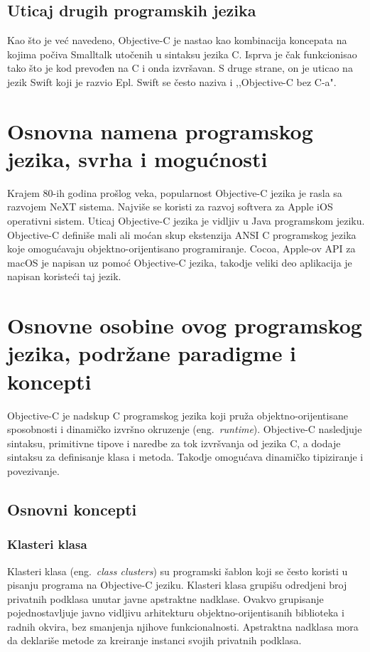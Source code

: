 \documentclass[a4paper]{article}
\begin{document}
\subsection{Uticaj drugih programskih jezika}
\label{subsec:uticaj}
Kao što je već navedeno, Objective-C je nastao kao kombinacija koncepata na kojima počiva Smalltalk utočenih u sintaksu jezika C. Isprva je čak funkcionisao tako što je kod prevođen na C i onda izvršavan. S druge strane, on je uticao na jezik Swift koji je razvio Epl. Swift se često naziva i ,,Objective-C bez C-a". 

\section{Osnovna namena programskog jezika, svrha i mogućnosti}
\label{sec:namena}
Krajem 80-ih godina prošlog veka, popularnost Objective-C jezika je rasla sa razvojem NeXT sistema. Najviše se koristi za razvoj softvera za Apple iOS operativni sistem. Uticaj Objective-C jezika je vidljiv u Java programskom jeziku.
Objective-C definiše mali ali moćan skup ekstenzija ANSI C programskog jezika koje omogućavaju objektno-orijentisano programiranje. Cocoa, Apple-ov API za macOS je napisan uz pomoć Objective-C jezika, takodje veliki deo aplikacija je napisan koristeći taj jezik. 

\section{Osnovne osobine ovog programskog jezika, podržane paradigme i koncepti}
\label{sec:osobine}
Objective-C je nadskup C programskog jezika koji pruža objektno-orijentisane sposobnosti i dinamičko izvršno okruzenje (eng.~{\em runtime}). Objective-C nasledjuje sintaksu, primitivne tipove i naredbe za tok izvršvanja od jezika C, a dodaje sintaksu za definisanje klasa i metoda. Takodje omogućava dinamičko tipiziranje i povezivanje.
\subsection{Osnovni koncepti}
\subsubsection{Klasteri klasa}
Klasteri klasa (eng.~{\em class clusters}) su programski šablon koji se često koristi u pisanju programa na Objective-C jeziku. Klasteri klasa grupišu odredjeni broj privatnih podklasa unutar javne apstraktne nadklase. 
Ovakvo grupisanje pojednostavljuje javno vidljivu arhitekturu objektno-orijentisanih biblioteka i radnih okvira, bez smanjenja njihove funkcionalnosti. Apstraktna nadklasa mora da deklariše metode za kreiranje instanci svojih privatnih podklasa. 
\end{document}
